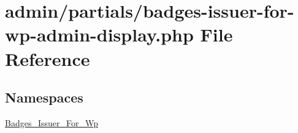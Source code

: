 \hypertarget{badges-issuer-for-wp-admin-display_8php}{}\section{admin/partials/badges-\/issuer-\/for-\/wp-\/admin-\/display.php File Reference}
\label{badges-issuer-for-wp-admin-display_8php}
\subsection*{Namespaces}
\begin{DoxyCompactItemize}
\item 
 \hyperlink{namespace_badges___issuer___for___wp}{Badges\+\_\+\+Issuer\+\_\+\+For\+\_\+\+Wp}
\end{DoxyCompactItemize}
